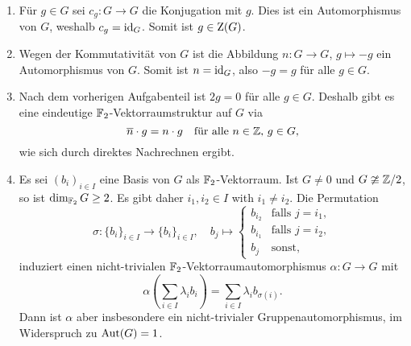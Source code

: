 \begin{solution}
  \begin{enumerate}
    \item
      Für $g \in G$ sei $c_g \colon G \to G$ die Konjugation mit $g$.
      Dies ist ein Automorphismus von $G$, weshalb $c_g = \operatorname{id}_G$.
      Somit ist $g \in \operatorname{Z}(G)$.
    \item
      Wegen der Kommutativität von $G$ ist die Abbildung $n \colon G \to G$, $g \mapsto -g$ ein Automorphismus von $G$.
      Somit ist $n = \operatorname{id}_G$, also $-g = g$ für alle $g \in G$.
    \item
      Nach dem vorherigen Aufgabenteil ist $2 g = 0$ für alle $g \in G$.
      Deshalb gibt es eine eindeutige $\mathbb{F}_2$-Vektorraumstruktur auf $G$ via
      \[
        \overline{n} \cdot g = n \cdot g
        \quad
        \text{für alle $n \in \mathbb{Z}$, $g \in G$},
      \]
      wie sich durch direktes Nachrechnen ergibt.
    \item
      Es sei $(b_i)_{i \in I}$ eine Basis von $G$ als $\mathbb{F}_2$-Vektorraum.
      Ist $G \neq 0$ und $G \ncong \mathbb{Z}/2$, so ist $\dim_{\mathbb{F}_2} G \geq 2$.
      Es gibt daher $i_1, i_2 \in I$ with $i_1 \neq i_2$.
      Die Permutation
      \[
        \sigma \colon \{b_i\}_{i \in I} \to \{b_i\}_{i \in I},
        \quad
        b_j
        \mapsto
        \begin{cases}
          b_{i_2} & \text{falls $j = i_1$}, \\
          b_{i_1} & \text{falls $j = i_2$}, \\
          b_j     & \text{sonst},
        \end{cases}
      \]
      induziert einen nicht-trivialen $\mathbb{F}_2$-Vek\-tor\-raum\-auto\-mor\-phis\-mus $\alpha \colon G \to G$ mit
      \[
          \alpha\left( \sum_{i \in I} \lambda_i b_i \right)
        = \sum_{i \in I} \lambda_i b_{\sigma(i)}.
      \]
      Dann ist $\alpha$ aber insbesondere ein nicht-trivialer Gruppenautomorphismus, im Widerspruch zu $\operatorname{Aut}(G) = 1$.
  \end{enumerate}
\end{solution}





